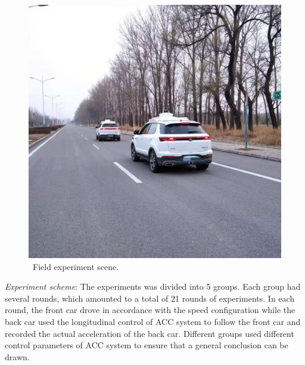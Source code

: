 \documentclass[a4paper,fleqn]{cas-sc}
\begin{document}
\begin{figure}
  \centering
  \includegraphics[width=14cm]{figs/experiment.jpg}
  \caption{~Field experiment scene.}
  \label{experiment}
\end{figure}

\textit{Experiment scheme}: The experiments was divided into 5 groups. Each group had several rounds, which amounted to a total of 21 rounds of experiments. In each round, the front car drove in accordance with the speed configuration while the back car used the longitudinal control of ACC system to follow the front car and recorded the actual acceleration of the back car. Different groups used different control parameters of ACC system to ensure that a general conclusion can be drawn.
\end{document}
